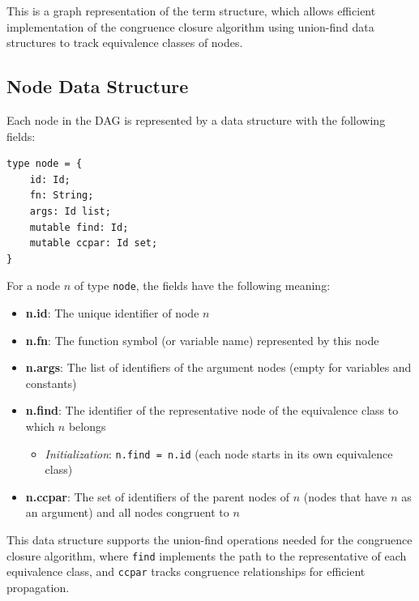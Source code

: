 \documentclass[11pt,a4paper]{article}
\theoremstyle{definition}
\theoremstyle{plain}
\theoremstyle{remark}
\begin{document}
This is a graph representation of the term structure, which allows efficient implementation of the congruence closure algorithm using union-find data structures to track equivalence classes of nodes.

\subsection{Node Data Structure}

\begin{tcolorbox}[colback=blue!5!white,colframe=blue!75!black,title=\textbf{Node Data Structure}]
Each node in the DAG is represented by a data structure with the following fields:

\begin{verbatim}
type node = { 
    id: Id;
    fn: String;
    args: Id list; 
    mutable find: Id;
    mutable ccpar: Id set;
}
\end{verbatim}

For a node $n$ of type \texttt{node}, the fields have the following meaning:

\begin{itemize}
    \item \textbf{n.id}: The unique identifier of node $n$
    
    \item \textbf{n.fn}: The function symbol (or variable name) represented by this node
    
    \item \textbf{n.args}: The list of identifiers of the argument nodes (empty for variables and constants)
    
    \item \textbf{n.find}: The identifier of the representative node of the equivalence class to which $n$ belongs
    \begin{itemize}
        \item \textit{Initialization}: \texttt{n.find = n.id} (each node starts in its own equivalence class)
    \end{itemize}
    
    \item \textbf{n.ccpar}: The set of identifiers of the parent nodes of $n$ (nodes that have $n$ as an argument) and all nodes congruent to $n$
\end{itemize}
\end{tcolorbox}

This data structure supports the union-find operations needed for the congruence closure algorithm, where \texttt{find} implements the path to the representative of each equivalence class, and \texttt{ccpar} tracks congruence relationships for efficient propagation.
\end{document}
